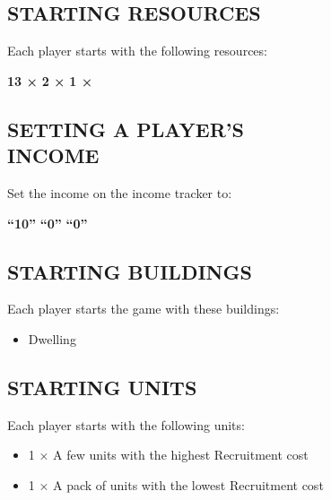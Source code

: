 \begin{multicols*}{2}
\subsection*{\MakeUppercase{Starting Resources}}
Each player starts with the following resources:
\begin{center}
    \textbf{13 ×}    \textbf{2 ×}      \textbf{1 ×} 
\end{center}
\subsection*{\MakeUppercase{Setting a Player's\\Income}}
Set the income on the income tracker to:
\begin{center}
    \textbf{“10”}    \textbf{“0”}      \textbf{“0”} 
\end{center}
\subsection*{\MakeUppercase{Starting Buildings}}
Each player starts the game with these buildings:
\begin{itemize}
    \item {} Dwelling
\end{itemize}
\subsection*{\MakeUppercase{Starting Units}}
Each player starts with the following units:
\begin{itemize}
    \item 1 × A few  units with the highest Recruitment cost
    \item 1 × A pack of  units with the lowest Recruitment cost
\end{itemize}

\end{multicols*}
